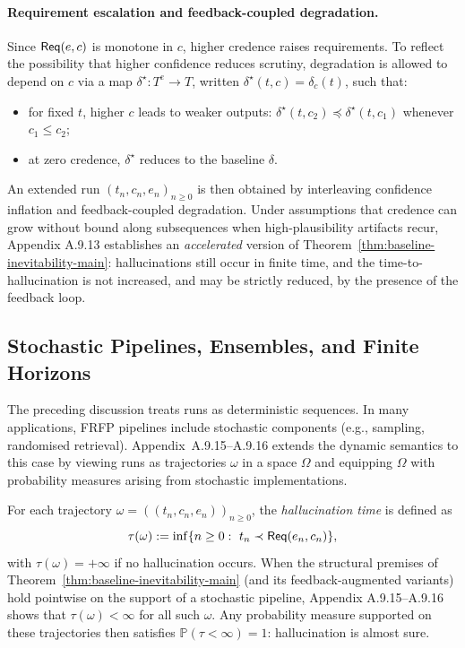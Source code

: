 \paragraph{Requirement escalation and feedback-coupled degradation.}
Since \(\mathsf{Req}(e,c)\) is monotone in \(c\), higher credence raises
requirements. To reflect the possibility that higher confidence reduces
scrutiny, degradation is allowed to depend on \(c\) via a map
\(\delta^\star:T^e\to T\), written \(\delta^\star(t,c)=\delta_c(t)\),
such that:
\begin{itemize}[leftmargin=2em]
  \item for fixed \(t\), higher \(c\) leads to weaker outputs:
        \(\delta^\star(t,c_2)\preceq \delta^\star(t,c_1)\) whenever
        \(c_1\le c_2\);
  \item at zero credence, \(\delta^\star\) reduces to the baseline
        \(\delta\).
\end{itemize}

An extended run \((t_n,c_n,e_n)_{n\ge 0}\) is then obtained by
interleaving confidence inflation and feedback-coupled degradation. Under
assumptions that credence can grow without bound along subsequences when
high-plausibility artifacts recur, Appendix A.9.13
establishes an \emph{accelerated} version of
Theorem~\ref{thm:baseline-inevitability-main}: hallucinations still
occur in finite time, and the time-to-hallucination is not increased,
and may be strictly reduced, by the presence of the feedback loop.

\subsection{Stochastic Pipelines, Ensembles, and Finite Horizons}

The preceding discussion treats runs as deterministic sequences. In many
applications, FRFP pipelines include stochastic components (e.g.,
sampling, randomised retrieval). Appendix~A.9.15–A.9.16
extends the dynamic semantics to this case by viewing runs as
trajectories \(\omega\) in a space \(\Omega\) and equipping \(\Omega\)
with probability measures arising from stochastic implementations.

For each trajectory \(\omega = ((t_n,c_n,e_n))_{n\ge 0}\), the
\emph{hallucination time} is defined as
\[
\tau(\omega)
 :=
\inf\{n\ge 0:\ t_n \prec \mathsf{Req}(e_n,c_n)\},
\]
with \(\tau(\omega)=+\infty\) if no hallucination occurs. When the
structural premises of Theorem~\ref{thm:baseline-inevitability-main}
(and its feedback-augmented variants) hold pointwise on the support of a
stochastic pipeline, Appendix A.9.15–A.9.16 shows that
\(\tau(\omega)<\infty\) for all such \(\omega\). Any probability measure
supported on these trajectories then satisfies
\(\mathbb{P}(\tau<\infty)=1\): hallucination is almost sure.

